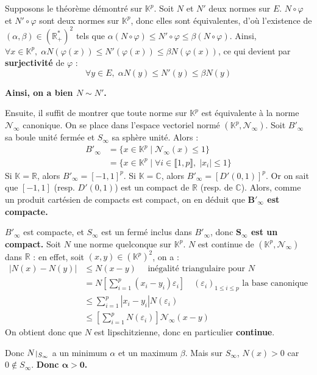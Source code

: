 \documentclass[12pt]{book}
\let\ensembleNombre\mathbb
\newcommand*\R{\ensuremath{\ensembleNombre{R}}}
\newcommand*\C{\ensuremath{\ensembleNombre{C}}}
\newcommand*\K{\ensuremath{\ensembleNombre{K}}}
\def\restriction#1#2{\mathchoice
				{\setbox1\hbox{${\displaystyle #1}_{\scriptstyle #2}$}
				\restrictionaux{#1}{#2}}
				{\setbox1\hbox{${\textstyle #1}_{\scriptstyle #2}$}
				\restrictionaux{#1}{#2}}
				{\setbox1\hbox{${\scriptstyle #1}_{\scriptscriptstyle #2}$}
				\restrictionaux{#1}{#2}}
				{\setbox1\hbox{${\scriptscriptstyle #1}_{\scriptscriptstyle #2}$}
				\restrictionaux{#1}{#2}}}
\def\restrictionaux#1#2{{#1\, \smash{\vrule height .8\ht1 depth .85\dp1}}_{\,#2}}
\theoremstyle{definition}
\theoremstyle{remark}
\begin{document}
	Supposons le théorème démontré sur $\K^p$. Soit $N$ et $N'$ deux normes sur $E$. $N \circ \varphi$ et $N' \circ \varphi$ sont deux normes sur $\K^p$, donc elles sont équivalentes, d'où l'existence de $(\alpha, \beta) \in \left( \R_+^* \right)^2$ tels que $\alpha (N \circ \varphi) \leq N' \circ \varphi \leq \beta (N \circ \varphi)$. Ainsi, $\forall x \in \K^p,\; \alpha N(\varphi(x)) \leq N'(\varphi(x)) \leq \beta N(\varphi(x))$, ce qui devient par \textbf{surjectivité} de $\varphi$ : 
	\[ \forall y \in E, \; \alpha N(y) \leq N'(y) \leq \beta N(y) \]
	
	\textbf{Ainsi, on a bien $N \sim N'$.}
	
	Ensuite, il suffit de montrer que toute norme sur $\K^p$ est équivalente à la norme $\mathcal N_\infty$ canonique. On se place dans l'espace vectoriel normé $(\K^p, \mathcal N_\infty)$. Soit $B'_\infty$ sa boule unité fermée et $S_\infty$ sa sphère unité. Alors :
	\begin{align*}
	B'_\infty &= \lbrace x \in \K^p \;|\; \mathcal N_\infty(x) \leq 1 \rbrace \\
	&= \lbrace x \in \K^p \;|\; \forall i \in \llbracket 1, p \rrbracket, \; |x_i| \leq 1 \rbrace
	\end{align*}
	Si $\K = \R$, alors $B'_\infty = [-1,1]^p$. Si $\K = \C$, alors $B'_\infty = [D'(0,1)]^p$. Or on sait que $[-1,1]$ (resp. $D'(0,1)$) est un compact de $\R$ (resp. de $\C$). Alors, comme un produit cartésien de compacts est compact, on en déduit que \textbf{$\bm{B'_\infty}$ est compacte.}
	
	$B'_\infty$ est compacte, et $S_\infty$ est un fermé inclus dans $B'_\infty$, donc \textbf{$\bm{S_\infty}$ est un compact.} Soit $N$ une norme quelconque sur $\K^p$. $N$ est continue de $(\K^p, \mathcal N_\infty)$ dans $\R$ : en effet, soit $(x,y) \in (\K^p)^2$, on a :
	\begin{align*}
	|N(x) - N(y)| &\leq N(x-y) \quad \text{ inégalité triangulaire pour } N \\
	&= N\left[ \sum_{i=1}^p (x_i - y_i) \varepsilon_i \right] \quad (\varepsilon_i)_{1\leq i\leq p} \text{ la base canonique} \\
	&\leq \sum_{i=1}^p |x_i - y_i| N(\varepsilon_i) \\
	&\leq \left[ \sum_{i=1}^p N(\varepsilon_i)\right] \mathcal N_\infty(x - y)
	\end{align*}	
	On obtient donc que $N$ est lipschitzienne, donc en particulier \textbf{continue}.
	
	Donc $\restriction{N}{S_\infty}$ a un minimum $\alpha$ et un maximum $\beta$. Mais sur $S_\infty$, $N(x) > 0$ car $0 \notin S_\infty$. \textbf{Donc $\bm{\alpha > 0}$.}
	
\end{document}
